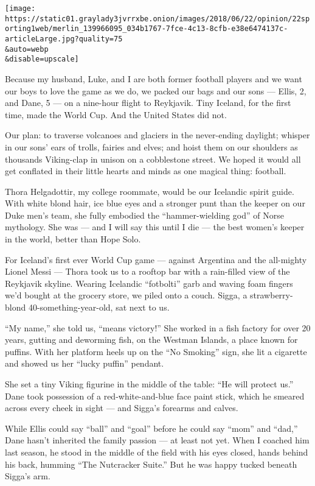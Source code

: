 \texttt{[image: https://static01.graylady3jvrrxbe.onion/images/2018/06/22/opinion/22sporting1web/merlin\_139966095\_034b1767-7fce-4c13-8cfb-e38e6474137c-articleLarge.jpg?quality=75\\\&auto=webp\\\&disable=upscale]}

Because my husband, Luke, and I are both former football players and we
want our boys to love the game as we do, we packed our bags and our sons
--- Ellis, 2, and Dane, 5 --- on a nine-hour flight to Reykjavik. Tiny
Iceland, for the first time, made the World Cup. And the United States
did not.

Our plan: to traverse volcanoes and glaciers in the never-ending
daylight; whisper in our sons' ears of trolls, fairies and elves; and
hoist them on our shoulders as thousands Viking-clap in unison on a
cobblestone street. We hoped it would all get conflated in their little
hearts and minds as one magical thing: football.

Thora Helgadottir, my college roommate, would be our Icelandic spirit
guide. With white blond hair, ice blue eyes and a stronger punt than the
keeper on our Duke men's team, she fully embodied the ``hammer-wielding
god'' of Norse mythology. She was --- and I will say this until I die
--- the best women's keeper in the world, better than Hope Solo.

For Iceland's first ever World Cup game --- against Argentina and the
all-mighty Lionel Messi --- Thora took us to a rooftop bar with a
rain-filled view of the Reykjavik skyline. Wearing Icelandic
``fotbolti'' garb and waving foam fingers we'd bought at the grocery
store, we piled onto a couch. Sigga, a strawberry-blond
40-something-year-old, sat next to us.

``My name,'' she told us, ``means victory!'' She worked in a fish
factory for over 20 years, gutting and deworming fish, on the Westman
Islands, a place known for puffins. With her platform heels up on the
``No Smoking'' sign, she lit a cigarette and showed us her ``lucky
puffin'' pendant.

She set a tiny Viking figurine in the middle of the table: ``He will
protect us.'' Dane took possession of a red-white-and-blue face paint
stick, which he smeared across every cheek in sight --- and Sigga's
forearms and calves.

While Ellis could say ``ball'' and ``goal'' before he could say ``mom''
and ``dad,'' Dane hasn't inherited the family passion --- at least not
yet. When I coached him last season, he stood in the middle of the field
with his eyes closed, hands behind his back, humming ``The Nutcracker
Suite.'' But he was happy tucked beneath Sigga's arm.

